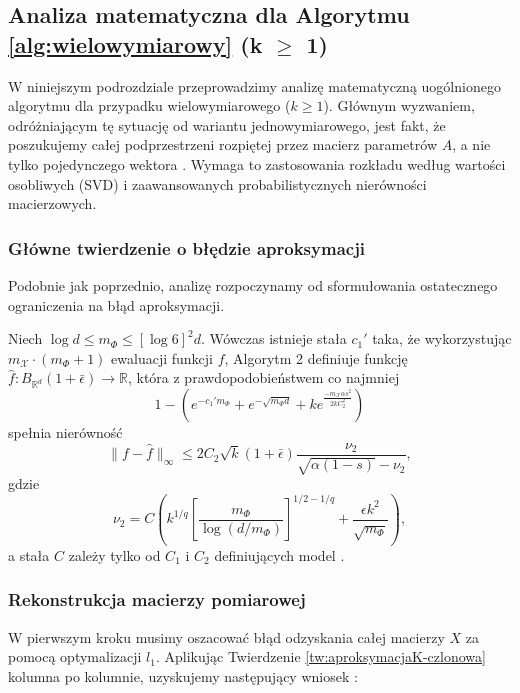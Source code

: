 \subsection{Analiza matematyczna dla Algorytmu \ref{alg:wielowymiarowy} (k $\ge$ 1)}

W niniejszym podrozdziale przeprowadzimy analizę matematyczną uogólnionego algorytmu dla przypadku wielowymiarowego ($k \ge 1$). Głównym wyzwaniem, odróżniającym tę sytuację od wariantu jednowymiarowego, jest fakt, że poszukujemy całej podprzestrzeni rozpiętej przez macierz parametrów $A$, a nie tylko pojedynczego wektora . Wymaga to zastosowania rozkładu według wartości osobliwych (SVD) i zaawansowanych probabilistycznych nierówności macierzowych.

\subsubsection{Główne twierdzenie o błędzie aproksymacji}

Podobnie jak poprzednio, analizę rozpoczynamy od sformułowania ostatecznego ograniczenia na błąd aproksymacji.

\begin{tw}\label{tw:zbieznoscalgorytmu2}
Niech $\log d \le m_\Phi \le [\log 6]^2 d$. Wówczas istnieje stała $c_1'$ taka, że wykorzystując $m_\mathcal{X} \cdot (m_\Phi + 1)$ ewaluacji funkcji $f$, Algorytm 2 definiuje funkcję $\hat{f}: B_{\mathbb{R}^d}(1+\bar{\epsilon}) \to \mathbb{R}$, która z prawdopodobieństwem co najmniej
$$1 - \left(e^{-c_1' m_\Phi} + e^{-\sqrt{m_\Phi d}} + k e^{\frac{-m_\mathcal{X} \alpha s^2}{2kC_2^2}}\right)$$
spełnia nierówność
$$\|f - \hat{f}\|_\infty \le 2C_2\sqrt{k}(1+\bar{\epsilon})\frac{\nu_2}{\sqrt{\alpha(1-s)} - \nu_2},$$
gdzie
$$\nu_2 = C\left(k^{1/q}\left[\frac{m_\Phi}{\log(d/m_\Phi)}\right]^{1/2 - 1/q} + \frac{\epsilon k^2}{\sqrt{m_\Phi}}\right),$$
a stała $C$ zależy tylko od $C_1$ i $C_2$ definiujących model .
\end{tw}

\subsubsection{Rekonstrukcja macierzy pomiarowej}

W pierwszym kroku musimy oszacować błąd odzyskania całej macierzy $X$ za pomocą optymalizacji $l_1$. Aplikując Twierdzenie \ref{tw:aproksymacjaK-czlonowa} kolumna po kolumnie, uzyskujemy następujący wniosek :

